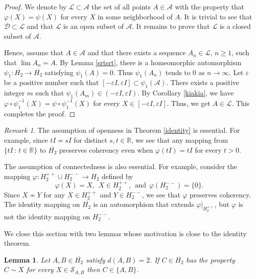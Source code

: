 \documentclass[10pt,a4paper]{amsart}
\newcommand\oH{{\overline{H_2}}}
\newtheorem{lemma}[theorem]{Lemma}
\theoremstyle{definition}
\theoremstyle{remark}
\newtheorem{remark}[theorem]{Remark}
\numberwithin{subsection}{section}
\numberwithin{equation}{section}
\begin{document}
\begin{proof}
We denote by $\mathcal{L} \subset \mathcal{A}$ the set of all points $A \in \mathcal{A}$ with the property that 
$\varphi (X) = \psi(X)$ for every $X$ in some neighborhood of $A$. It is trivial to see that $\mathcal{D}\subset \mathcal{L}$ and that $\mathcal{L}$ is an open subset of $\mathcal{A}$.
It remains to prove that $\mathcal{L}$ is a closed subset of $\mathcal{A}$. 

Hence, assume that $A \in \mathcal{A}$ and that there exists a sequence $A_n \in \mathcal{L}$, $n\geq 1$, such that $\lim A_n = A$. 
By Lemma \ref{srtsrt}, there is a homeomorphic automorphism $\psi_1\colon \oH\to\oH$ satisfying $\psi_1(A)=0$. 
Thus $\psi_1(A_n)$ tends to $0$ as $n\to\infty$. 
Let $\varepsilon$ be a positive number such that $[- \varepsilon I, \varepsilon I] \subset \psi_1(\mathcal{A})$. There exists a positive integer $m$ such that $\psi_1(A_m) \in 
(- \varepsilon I, \varepsilon I)$. 
By Corollary \ref{kiakia}, we have 
 $\varphi\circ \psi_1^{-1} (X) = \psi\circ \psi_1^{-1}(X)$ for every $X \in [- \varepsilon I, \varepsilon I]$. Thus, we get $A\in \mathcal{L}$. 
This completes the proof.
\end{proof}

\begin{remark}
The assumption of openness in Theorem \ref{identity} is essential. 
For example, since $tI\not\sim sI$ for distinct $s,t\in \mathbb{R}$, we see that any mapping from  $\{tI\,:\, t\in \mathbb{R}\}$ to $\oH$ preserves coherency even when $\varphi(tI)=tI$ for every $t>0$.

The assumption of connectedness is also essential. 
For example, consider the mapping $\varphi\colon H_2^{++}\cup H_2^{--}\to H_2$ defined by 
\[
\varphi(X)=X, \ \ X\in H_2^{++},\ \ \text{and}\ \ \varphi(H_2^{--})=\{0\}. 
\]
Since $X\not\sim Y$ for any $X\in H_2^{++}$ and $Y\in H_2^{--}$, we see that $\varphi$ preserves coherency.
The identity mapping on $\oH$ is an automorphism that extends $\varphi|_{H_2^{++}}$, but $\varphi$ is not the identity mapping on $H_2^{--}$.   
\end{remark}

We close this section with two lemmas whose motivation is close to the identity theorem. 

\begin{lemma}\label{sss}
Let $A, B\in \oH$ satisfy $d(A, B)=2$. 
If $C\in \oH$ has the property $C\sim X$ for every $X\in \mathcal{S}_{A, B}$ then $C\in \{A, B\}$.
\end{lemma}
\end{document}
